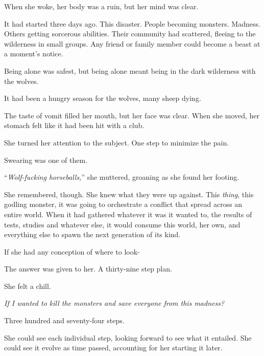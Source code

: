 When she woke, her body was a ruin, but her mind was clear.



It had started three days ago.  This disaster.  People becoming monsters.  Madness.  Others getting sorcerous abilities.  Their community had scattered, fleeing to the wilderness in small groups.  Any friend or family member could become a beast at a moment's notice.



Being alone was safest, but being alone meant being in the dark wilderness with the wolves.



It had been a hungry season for the wolves, many sheep dying.



The taste of vomit filled her mouth, but her face was clear.  When she moved, her stomach felt like it had been hit with a club.



She turned her attention to the subject.  One step to minimize the pain.



Swearing was one of them.



``\emph{Wolf-fucking horseballs,}'' she muttered, groaning as she found her footing.



She remembered, though.  She knew what they were up against.  This \emph{thing}, this godling monster, it was going to orchestrate a conflict that spread across an entire world.  When it had gathered whatever it was it wanted to, the results of tests, studies and whatever else, it would consume this world, her own, and everything else to spawn the next generation of its kind.



If she had any conception of where to look-



The answer was given to her.  A thirty-nine step plan.



She felt a chill.



\emph{If I wanted to kill the monsters and save everyone from this madness?}



Three hundred and seventy-four steps.



She could see each individual step, looking forward to see what it entailed.  She could see it evolve as time passed, accounting for her starting it later.



